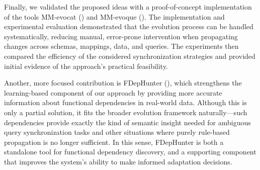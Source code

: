 Finally, we validated the proposed ideas with a proof-of-concept implementation of the tools MM-evocat () and MM-evoque (). The implementation and experimental evaluation demonstrated that the evolution process can be handled systematically, reducing manual, error-prone intervention when propagating changes across schemas, mappings, data, and queries. The experiments then compared the efficiency of the considered synchronization strategies and provided initial evidence of the approach's practical feasibility.

Another, more focused contribution is FDepHunter (), which strengthens the learning-based component of our approach by providing more accurate information about functional dependencies in real-world data. Although this is only a partial solution, it fits the broader evolution framework naturally---such dependencies provide exactly the kind of semantic insight needed for ambiguous query synchronization tasks and other situations where purely rule-based propagation is no longer sufficient. In this sense, FDepHunter is both a standalone tool for functional dependency discovery, and a supporting component that improves the system's ability to make informed adaptation decisions.
